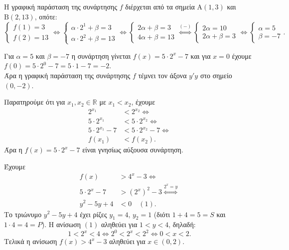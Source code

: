 \documentclass[11pt,a4paper,twoside]{book}
\begin{document}
\begin{alist}
\item Η γραφική παράσταση της συνάρτησης $f$ διέρχεται από τα σημεία $\text{A}(1,3)$ και $\text{B}(2,13)$, οπότε:
\[\begin{cases} f(1) = 3 \\ f(2) = 13 \end{cases} \Leftrightarrow \begin{cases} \alpha\cdot 2^1 + \beta = 3 \\ \alpha\cdot 2^2 + \beta = 13 \end{cases} \Leftrightarrow \begin{cases} 2\alpha + \beta = 3 \\ 4\alpha + \beta = 13 \end{cases} \overset{(-)}{\iff} \begin{cases} 2\alpha = 10 \\ 2\alpha + \beta = 3 \end{cases} \Leftrightarrow \begin{cases} \alpha = 5 \\ \beta = -7 \end{cases}.\]
\item Για $\alpha = 5$ και $\beta = -7$ η συνάρτηση γίνεται $f(x) = 5\cdot 2^x - 7$ και για $x = 0$ έχουμε $f(0) = 5\cdot 2^0 - 7 = 5\cdot 1 - 7 = -2$. \\
Άρα η γραφική παράσταση της συνάρτησης $f$ τέμνει τον άξονα $y'y$ στο σημείο $(0,-2)$.
\item Παρατηρούμε ότι για $x_1, x_2 \in \mathbb{R}$ με $x_1 < x_2$, έχουμε
\begin{align*}
2^{x_1} &< 2^{x_2} \Leftrightarrow \\
5\cdot 2^{x_1} &< 5\cdot 2^{x_2} \Leftrightarrow \\
5\cdot 2^{x_1} - 7 &< 5\cdot 2^{x_2} - 7 \Leftrightarrow \\
f(x_1) &< f(x_2).
\end{align*}
Άρα η $f(x) = 5\cdot 2^x - 7$ είναι γνησίως αύξουσα συνάρτηση.
\item Έχουμε
\begin{align*}
f(x) &> 4^x - 3 \Leftrightarrow \\
5\cdot 2^x - 7 &> (2^x)^2 - 3 \overset{2^x=y}{\iff} \\
y^2 - 5y + 4 &< 0 \quad (1).
\end{align*}
Το τριώνυμο $y^2 - 5y + 4$ έχει ρίζες $y_1 = 4$, $y_2 = 1$ (διότι $1+4=5=S$ και $1\cdot 4=4=P$). Η ανίσωση $(1)$ αληθεύει για $1 < y < 4$, δηλαδή:
\[1 < 2^x < 4 \Leftrightarrow 2^0 < 2^x < 2^2 \Leftrightarrow 0 < x < 2.\]
Τελικά η ανίσωση $f(x) > 4^x - 3$ αληθεύει για $x \in (0,2)$.
\end{alist}
\end{document}
